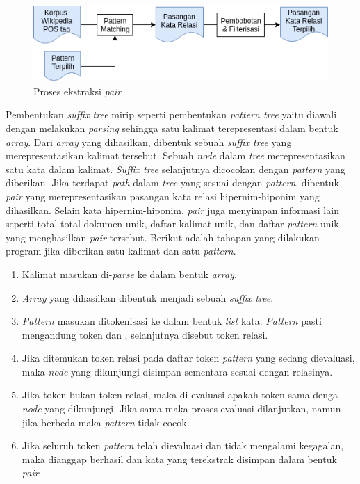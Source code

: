 \begin{figure}
    \centering
    \includegraphics[scale=0.6]{pics/Pic04-PatternMatching}
    \caption{Proses ekstraksi \textit{pair}}
    \label{fig:pattern-matching}
\end{figure}

Pembentukan \textit{suffix tree} mirip seperti pembentukan \textit{pattern tree} yaitu diawali dengan melakukan \textit{parsing} sehingga satu kalimat terepresentasi dalam bentuk \textit{array}. Dari \textit{array} yang dihasilkan, dibentuk sebuah \textit{suffix tree} yang merepresentasikan kalimat tersebut. Sebuah \textit{node} dalam \textit{tree} merepresentasikan satu kata dalam kalimat. \textit{Suffix tree} selanjutnya dicocokan dengan \textit{pattern} yang diberikan. Jika terdapat \textit{path} dalam \textit{tree} yang sesuai dengan \textit{pattern}, dibentuk \textit{pair} yang merepresentasikan pasangan kata relasi hipernim-hiponim yang dihasilkan. Selain kata hipernim-hiponim, \textit{pair} juga menyimpan informasi lain seperti total total dokumen unik, daftar kalimat unik, dan daftar \textit{pattern} unik yang menghasilkan \textit{pair} tersebut. Berikut adalah tahapan yang dilakukan program jika diberikan satu kalimat dan satu \textit{pattern}.

\begin{enumerate}
  \item Kalimat masukan di-\textit{parse} ke dalam bentuk \textit{array}.
  \item \textit{Array} yang dihasilkan dibentuk menjadi sebuah \textit{suffix tree}.
  \item \textit{Pattern} masukan ditokenisasi ke dalam bentuk \textit{list} 
  kata. \textit{Pattern} pasti mengandung token {\tagHypernym} dan {\tagHyponym}, selanjutnya disebut token relasi.
  \item Jika ditemukan token relasi pada daftar token \textit{pattern} yang sedang dievaluasi, maka \textit{node} yang dikunjungi disimpan sementara sesuai dengan relasinya.
  \item Jika token bukan token relasi, maka di evaluasi apakah token sama denga  \textit{node} yang dikunjungi. Jika sama maka proses evaluasi dilanjutkan, namun jika berbeda maka \textit{pattern} tidak cocok.
  \item Jika seluruh token \textit{pattern} telah dievaluasi dan tidak mengalami kegagalan, maka dianggap berhasil dan kata yang terekstrak disimpan dalam bentuk \textit{pair}.
\end{enumerate}

